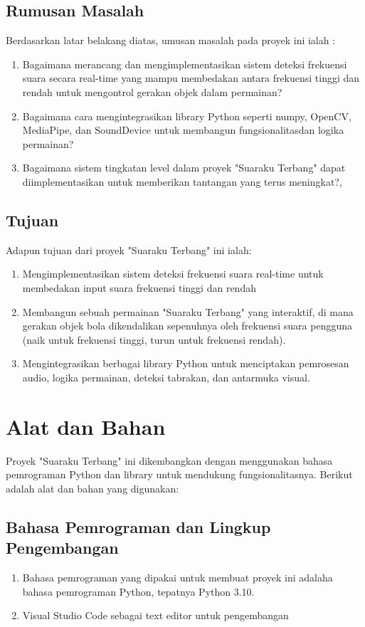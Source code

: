 \documentclass[11pt,a4paper]{article}
\begin{document}
\subsection{Rumusan Masalah}
Berdasarkan latar belakang diatas, umusan masalah pada proyek ini ialah : 
\begin{enumerate}
    \item Bagaimana merancang dan mengimplementasikan sistem deteksi frekuensi suara secara real-time yang mampu membedakan antara frekuensi tinggi dan rendah untuk mengontrol gerakan objek dalam permainan?
    \item Bagaimana cara mengintegrasikan library Python seperti numpy, OpenCV, MediaPipe, dan SoundDevice untuk membangun fungsionalitasdan logika permainan?
    \item Bagaimana sistem tingkatan level dalam proyek "Suaraku Terbang" dapat diimplementasikan untuk memberikan tantangan yang terus meningkat?,
\end{enumerate}

\subsection{Tujuan}
Adapun tujuan dari proyek "Suaraku Terbang" ini ialah:
\begin{enumerate}
    \item Mengimplementasikan sistem deteksi frekuensi suara real-time untuk membedakan input suara frekuensi tinggi dan rendah
    \item Membangun sebuah permainan "Suaraku Terbang" yang interaktif, di mana gerakan objek bola dikendalikan sepenuhnya oleh frekuensi suara pengguna (naik untuk frekuensi tinggi, turun untuk frekuensi rendah).
    \item Mengintegrasikan berbagai library Python untuk menciptakan pemrosesan audio, logika permainan, deteksi tabrakan, dan antarmuka visual.
\end{enumerate}

\section{Alat dan Bahan}
Proyek "Suaraku Terbang" ini dikembangkan dengan menggunakan bahasa pemrograman Python dan library untuk mendukung fungsionalitasnya. Berikut adalah alat dan bahan yang digunakan:
\subsection{Bahasa Pemrograman dan Lingkup Pengembangan}
\begin{enumerate}
    \item Bahasa pemrograman yang dipakai untuk membuat proyek ini adalaha bahasa pemrograman Python, tepatnya Python 3.10.
    \item Visual Studio Code sebagai text editor untuk pengembangan
\end{enumerate}
\end{document}
